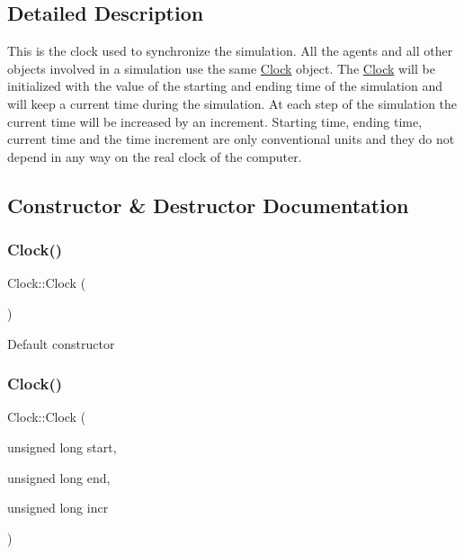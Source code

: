 \subsection{Detailed Description}
This is the clock used to synchronize the simulation. All the agents and all other objects involved in a simulation use the same \mbox{\hyperlink{class_clock}{Clock}} object. The \mbox{\hyperlink{class_clock}{Clock}} will be initialized with the value of the starting and ending time of the simulation and will keep a current time during the simulation. At each step of the simulation the current time will be increased by an increment. Starting time, ending time, current time and the time increment are only conventional units and they do not depend in any way on the real clock of the computer. 

\subsection{Constructor \& Destructor Documentation}
\mbox{\label{class_clock_adbc370eb6b5f8d01645cf440188160a8}} 
\subsubsection{\texorpdfstring{Clock()}{Clock()}\hspace{0.1cm}{\footnotesize\ttfamily [1/2]}}
{\footnotesize\ttfamily Clock\+::\+Clock (\begin{DoxyParamCaption}{ }\end{DoxyParamCaption})}

Default constructor \mbox{\label{class_clock_a89a798e152f8eba2f6eb80ec92b26ece}} 
\subsubsection{\texorpdfstring{Clock()}{Clock()}\hspace{0.1cm}{\footnotesize\ttfamily [2/2]}}
{\footnotesize\ttfamily Clock\+::\+Clock (\begin{DoxyParamCaption}\item[{unsigned long}]{start,  }\item[{unsigned long}]{end,  }\item[{unsigned long}]{incr }\end{DoxyParamCaption})}

